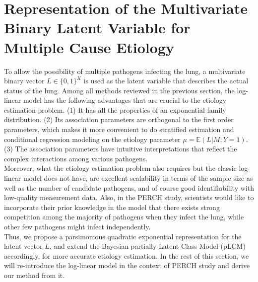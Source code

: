 \documentclass[11 pt, a4paper]{article}  %
\begin{document}
\section{Representation of the Multivariate Binary Latent Variable for Multiple Cause Etiology}
To allow the possibility of multiple pathogens infecting the lung, a multivariate binary vector $L\in \{0,1 \}^K$ is used as the latent variable that describes the actual status of the lung. Among all methods reviewed in the previous section, the log-linear model has the following advantages that are crucial to the etiology estimation problem. (1) It has all the properties of an exponential family distribution. (2) Its association parameters are orthogonal to the first order parameters, which makes it more convenient to do stratified estimation and conditional regression modeling on the etiology parameter $\mu=\mathbb{E}(L|M, Y=1)$. (3) The association parameters have intuitive interpretations that reflect the complex interactions among various pathogens. \\

Moreover, what the etiology estimation problem also requires but the classic log-linear model does not have, are excellent scalability in terms of the sample size as well as the number of candidate pathogens, and of course good identifiability with low-quality measurement data. Also, in the PERCH study, scientists would like to incorporate their prior knowledge in the model that there exists strong competition among the majority of pathogens when they infect the lung, while other few pathogens might infect independently.\\

Thus, we propose a parsimonious quadratic exponential representation for the latent vector $L$, and extend the Bayesian partially-Latent Class Model (pLCM) accordingly, for more accurate etiology estimation. In the rest of this section, we will re-introduce the log-linear model in the context of PERCH study and derive our method from it.\\
\end{document}
